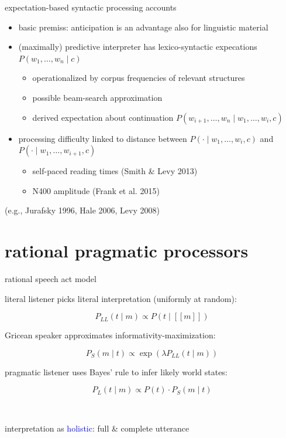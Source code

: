 \documentclass[ignorenonframetext,]{beamer}
\providecommand{\tightlist}{%
\setlength{\itemsep}{0pt}\setlength{\parskip}{0pt}}
\begin{document}
\begin{frame}{expectation-based syntactic processing accounts}

\begin{itemize}
\tightlist
\item
  basic premiss: anticipation is an advantage also for linguistic
  material
\item
  (maximally) predictive interpreter has {lexico-syntactic expecations}
  \(P(w_1, \dots, w_n \mid c)\)

  \begin{itemize}
  \tightlist
  \item
    operationalized by corpus frequencies of relevant structures
  \item
    possible beam-search approximation
  \item
    derived expectation about continuation
    \(P(w_{i+1}, \dots, w_n \mid w_1, \dots, w_i, c)\)
  \end{itemize}
\item
  {processing difficulty} linked to distance between
  \(P(\cdot \mid w_1, \dots, w_i, c)\) and
  \(P(\cdot \mid w_1, \dots, w_{i+1}, c)\)

  \begin{itemize}
  \tightlist
  \item
    self-paced reading times (Smith \& Levy 2013)
  \item
    N400 amplitude (Frank et al. 2015)
  \end{itemize}
\end{itemize}

\bigskip

\hfill (e.g., Jurafsky 1996, Hale 2006, Levy 2008)

\end{frame}

\section{rational pragmatic
processors}\label{rational-pragmatic-processors}

\begin{frame}{rational speech act model}

{literal listener} picks literal interpretation (uniformly at random):

\[ P_{LL}(t \mid m) \propto P(t \mid [\![m]\!]) \]

{Gricean speaker} approximates informativity-maximization:

\[ P_{S}(m \mid t) \propto \exp( \lambda P_{LL}(t \mid m)) \]

{pragmatic listener} uses Bayes' rule to infer likely world states:

\[ P_L(t \mid m ) \propto P(t) \cdot P_S(m \mid t) \]

{ ~ }

\bigskip

\hfill interpretation as \textcolor{blue}{holistic}: full \& complete
utterance

\end{frame}
\end{document}
